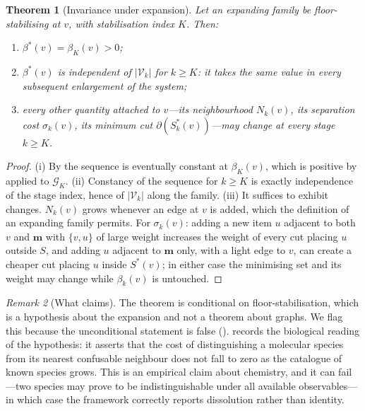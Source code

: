\documentclass[11pt,twocolumn,a4paper]{article}
\newtheorem{theorem}{Theorem}[section]
\theoremstyle{definition}
\theoremstyle{remark}
\newtheorem{remark}[theorem]{Remark}
\newcommand{\Gph}{\mathcal{G}}
\newcommand{\V}{\mathcal{V}}
\newcommand{\med}{\mathbf{m}}
\newcommand{\cut}{\partial}
\newcommand{\flo}{\beta}
\newcommand{\sep}{\sigma}
\begin{document}
\begin{theorem}[Invariance under expansion]
\label{thm:invariance}
Let an expanding family be floor-stabilising at $v$, with stabilisation
index $K$. Then:
\begin{enumerate}[label=\textup{(\roman*)},leftmargin=2.2em]
  \item $\flo^{*}(v)=\flo_K(v)>0$;
  \item $\flo^{*}(v)$ is independent of $|\V_k|$ for $k\ge K$: it takes
  the same value in every subsequent enlargement of the system;
  \item every other quantity attached to $v$---its neighbourhood
  $N_k(v)$, its separation cost $\sep_k(v)$, its minimum cut
  $\cut(S^{*}_k(v))$---may change at every stage $k\ge K$.
\end{enumerate}
\end{theorem}

\begin{proof}
(i) By  the sequence is eventually constant at
$\flo_K(v)$, which is positive by  applied to $\Gph_K$.
(ii) Constancy of the sequence for $k\ge K$ is exactly independence of the
stage index, hence of $|\V_k|$ along the family. (iii) It suffices to
exhibit changes. $N_k(v)$ grows whenever an edge at $v$ is added, which
the definition of an expanding family permits. For $\sep_k(v)$: adding a
new item $u$ adjacent to both $v$ and $\med$ with $\{v,u\}$ of large
weight increases the weight of every cut placing $u$ outside $S$, and
adding $u$ adjacent to $\med$ only, with a light edge to $v$, can create a
cheaper cut placing $u$ inside $S^{*}(v)$; in either case the minimising
set and its weight may change while $\flo_k(v)$ is untouched.
\end{proof}

\begin{remark}[What  claims]
\label{rem:invariance-honest}
The theorem is conditional on floor-stabilisation, which is a hypothesis
about the expansion and not a theorem about graphs. We flag this because
the unconditional statement is false
().  records the biological
reading of the hypothesis: it asserts that the cost of distinguishing a
molecular species from its nearest confusable neighbour does not fall to
zero as the catalogue of known species grows. This is an empirical claim
about chemistry, and it can fail---two species may prove to be
indistinguishable under all available observables---in which case the
framework correctly reports dissolution rather than identity.
\end{remark}
\end{document}
